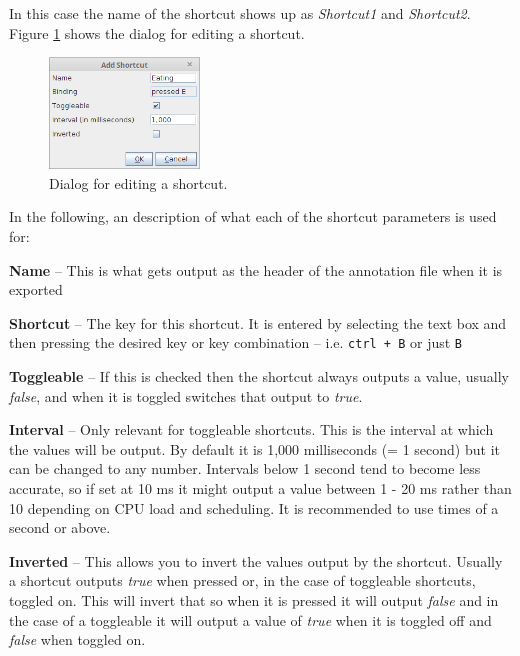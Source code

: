 \documentclass[a4paper]{book}
\begin{document}
In this case the name of the shortcut shows up as \textit{Shortcut1} and
\textit{Shortcut2}. Figure \ref{AnnotatorAddShortcut} shows the dialog for editing a
shortcut.

\begin{figure}[htb]
  \centering
  \includegraphics[width=4.0cm]{images/AnnotatorAddShortcut.png}
  \caption{Dialog for editing a shortcut.}
  \label{AnnotatorAddShortcut}
\end{figure}

In the following, an description of what each of the shortcut parameters is
used for:
\begin{tight_itemize}
  \item \textbf{Name} -- This is what gets output as the header of the
  annotation file when it is exported
  \item \textbf{Shortcut} -- The key for this shortcut. It is entered by
  selecting the text box and then pressing the desired key or key combination
  -- i.e. \texttt{ctrl + B} or just \texttt{B}
  \item \textbf{Toggleable} -- If this is checked then the shortcut always
  outputs a value, usually \textit{false}, and when it is toggled switches
  that output to \textit{true}.
  \item \textbf{Interval} -- Only relevant for toggleable shortcuts. This is
  the interval at which the values will be output. By default it is 1,000
  milliseconds (= 1 second) but it can be changed to any number. Intervals
  below 1 second tend to become less accurate, so if set at 10 ms it might
  output a value between 1 - 20 ms rather than 10 depending on CPU load and
  scheduling. It is recommended to use times of a second or above.
  \item \textbf{Inverted} -- This allows you to invert the values output
  by the shortcut. Usually a shortcut outputs \textit{true} when pressed or, in the
  case of toggleable shortcuts, toggled on. This will invert that so when
  it is pressed it will output \textit{false} and in the case of a toggleable it
  will output a value of \textit{true} when it is toggled off and \textit{false} when toggled on.
\end{tight_itemize}
\end{document}
